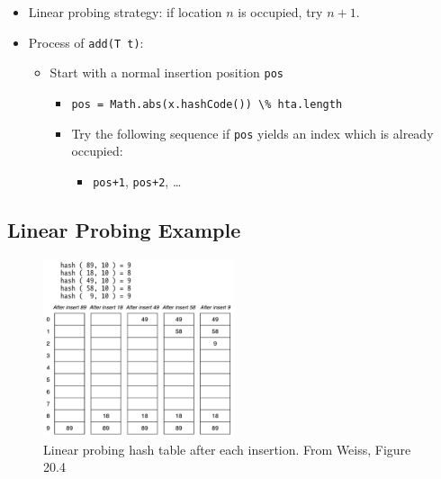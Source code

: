 \documentclass[
  10pt,
  english,
  letterpaper,
,tablecaptionabove
]{scrartcl}
\newcommand{\passthrough}[1]{#1}
\providecommand{\tightlist}{%
  \setlength{\itemsep}{0pt}\setlength{\parskip}{0pt}}
\begin{document}
\begin{itemize}
\tightlist
\item
  Linear probing strategy: if location \(n\) is occupied, try \(n+1\).
\item
  Process of \passthrough{\lstinline!add(T t)!}:

  \begin{itemize}
  \tightlist
  \item
    Start with a normal insertion position \passthrough{\lstinline!pos!}

    \begin{itemize}
    \tightlist
    \item
      \passthrough{\lstinline!pos = Math.abs(x.hashCode()) \% hta.length!}
    \item
      Try the following sequence if \passthrough{\lstinline!pos!} yields
      an index which is already occupied:

      \begin{itemize}
      \tightlist
      \item
        \passthrough{\lstinline!pos+1!},
        \passthrough{\lstinline!pos+2!}, \ldots{}
      \end{itemize}
    \end{itemize}
  \end{itemize}
\end{itemize}

\hypertarget{linear-probing-example}{%
\subsection{Linear Probing Example}\label{linear-probing-example}}

\begin{figure}
\centering
\includegraphics[width=0.5\textwidth,height=\textheight]{images/1.png}
\caption{Linear probing hash table after each insertion. From Weiss,
Figure 20.4}
\end{figure}
\end{document}
